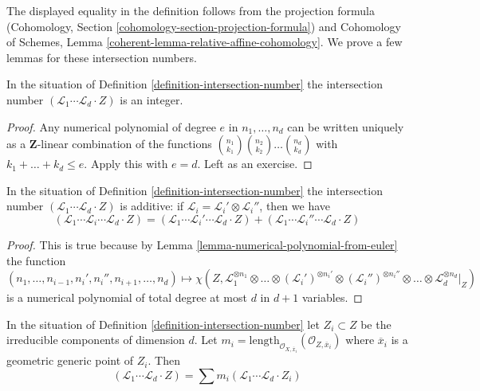 \noindent
The displayed equality in the definition follows from
the projection formula
(Cohomology, Section \ref{cohomology-section-projection-formula}) and
Cohomology of Schemes, Lemma
\ref{coherent-lemma-relative-affine-cohomology}.
We prove a few lemmas for these intersection numbers.

\begin{lemma}
\label{lemma-intersection-number-integer}
In the situation of Definition \ref{definition-intersection-number}
the intersection number
$(\mathcal{L}_1 \cdots \mathcal{L}_d \cdot Z)$
is an integer.
\end{lemma}

\begin{proof}
Any numerical polynomial of degree $e$ in $n_1, \ldots, n_d$ can be
written uniquely as a $\mathbf{Z}$-linear combination of the functions
${n_1 \choose k_1}{n_2 \choose k_2} \ldots {n_d \choose k_d}$ with
$k_1 + \ldots + k_d \leq e$. Apply this with $e = d$.
Left as an exercise.
\end{proof}

\begin{lemma}
\label{lemma-intersection-number-additive}
In the situation of Definition \ref{definition-intersection-number}
the intersection number
$(\mathcal{L}_1 \cdots \mathcal{L}_d \cdot Z)$
is additive: if $\mathcal{L}_i = \mathcal{L}_i' \otimes \mathcal{L}_i''$,
then we have
$$
(\mathcal{L}_1 \cdots \mathcal{L}_i \cdots \mathcal{L}_d \cdot Z) =
(\mathcal{L}_1 \cdots \mathcal{L}_i' \cdots \mathcal{L}_d \cdot Z) +
(\mathcal{L}_1 \cdots \mathcal{L}_i'' \cdots \mathcal{L}_d \cdot Z)
$$
\end{lemma}

\begin{proof}
This is true because by Lemma \ref{lemma-numerical-polynomial-from-euler}
the function
$$
(n_1, \ldots, n_{i - 1}, n_i', n_i'', n_{i + 1}, \ldots, n_d)
\mapsto
\chi(Z, \mathcal{L}_1^{\otimes n_1} \otimes
\ldots \otimes (\mathcal{L}_i')^{\otimes n_i'} \otimes
(\mathcal{L}_i'')^{\otimes n_i''} \otimes \ldots \otimes
\mathcal{L}_d^{\otimes n_d}|_Z)
$$
is a numerical polynomial of total degree at most $d$ in $d + 1$ variables.
\end{proof}

\begin{lemma}
\label{lemma-intersection-number-in-terms-of-components}
In the situation of Definition \ref{definition-intersection-number}
let $Z_i \subset Z$ be the irreducible components of dimension $d$. Let
$m_i = \text{length}_{\mathcal{O}_{X, \overline{x}_i}}
(\mathcal{O}_{Z, \overline{x}_i})$
where $\overline{x}_i$ is a geometric generic point of $Z_i$. Then
$$
(\mathcal{L}_1 \cdots \mathcal{L}_d \cdot Z) =
\sum m_i(\mathcal{L}_1 \cdots \mathcal{L}_d \cdot Z_i)
$$
\end{lemma}

